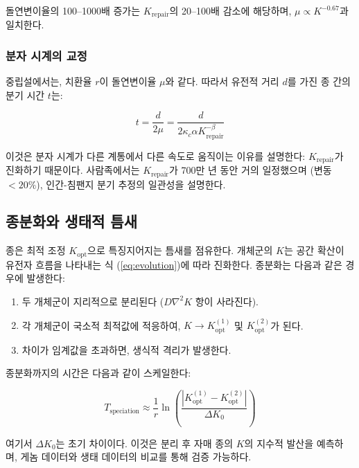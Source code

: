 \documentclass[12pt,a4paper]{article}
\newcommand{\Keffopt}{K_{\mathrm{opt}}}
\newcommand{\kappac}{\kappa_c}
\theoremstyle{remark}
\begin{document}
	돌연변이율의 100--1000배 증가는 \(K_{\text{repair}}\)의 20--100배 감소에 해당하며, \(\mu \propto K^{-0.67}\)과 일치한다.
	
	\subsubsection{분자 시계의 교정}
	
	중립설에서는, 치환율 \(r\)이 돌연변이율 \(\mu\)와 같다. 따라서 유전적 거리 \(d\)를 가진 종 간의 분기 시간 \(t\)는:
	
	\begin{equation}
		t = \frac{d}{2\mu} = \frac{d}{2\kappac \alpha K_{\text{repair}}^{-\beta}}
		\label{eq:molecular-clock}
	\end{equation}
	
	이것은 분자 시계가 다른 계통에서 다른 속도로 움직이는 이유를 설명한다: \(K_{\text{repair}}\)가 진화하기 때문이다. 사람족에서는 \(K_{\text{repair}}\)가 700만 년 동안 거의 일정했으며 (변동 \(<20\%\)), 인간-침팬지 분기 추정의 일관성을 설명한다.
	
	\subsection{종분화와 생태적 틈새}
	
	종은 최적 조정 \(\Keffopt\)으로 특징지어지는 틈새를 점유한다. 개체군의 \(K\)는 공간 확산이 유전자 흐름을 나타내는 식 (\ref{eq:evolution})에 따라 진화한다. 종분화는 다음과 같은 경우에 발생한다:
	
	\begin{enumerate}
		\item 두 개체군이 지리적으로 분리된다 (\(D \nabla^2 K\) 항이 사라진다).
		\item 각 개체군이 국소적 최적값에 적응하여, \(K \to \Keffopt^{(1)}\) 및 \(\Keffopt^{(2)}\)가 된다.
		\item 차이가 임계값을 초과하면, 생식적 격리가 발생한다.
	\end{enumerate}
	
	종분화까지의 시간은 다음과 같이 스케일한다:
	
	\begin{equation}
		T_{\text{speciation}} \approx \frac{1}{r} \ln\left( \frac{|\Keffopt^{(1)} - \Keffopt^{(2)}|}{\Delta K_0} \right)
		\label{eq:speciation-time}
	\end{equation}
	
	여기서 \(\Delta K_0\)는 초기 차이이다. 이것은 분리 후 자매 종의 \(K\)의 지수적 발산을 예측하며, 게놈 데이터와 생태 데이터의 비교를 통해 검증 가능하다.
	
\end{document}
